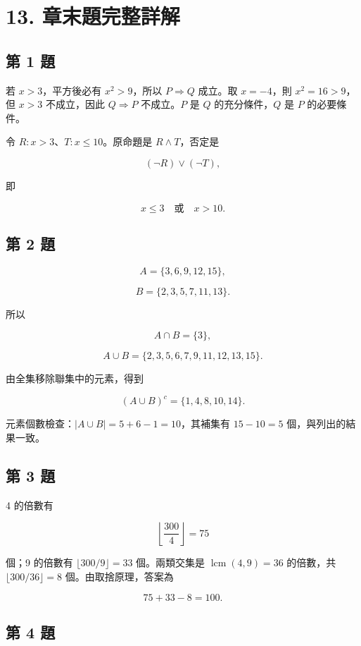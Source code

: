 \documentclass[11pt,a4paper]{article}
\begin{document}
\section{13. 章末題完整詳解}\label{ux7ae0ux672bux984cux5b8cux6574ux8a73ux89e3}

\subsection{第 1 題}\label{ux7b2c-1-ux984c}

若 \(x>3\)，平方後必有 \(x^2>9\)，所以 \(P\Rightarrow Q\) 成立。取 \(x=-4\)，則 \(x^2=16>9\)，但 \(x>3\) 不成立，因此 \(Q\Rightarrow P\) 不成立。\(P\) 是 \(Q\) 的充分條件，\(Q\) 是 \(P\) 的必要條件。

令 \(R:x>3\)、\(T:x\le10\)。原命題是 \(R\wedge T\)，否定是

\[
(\neg R)\vee(\neg T),
\]

即

\[
x\le3\quad\text{或}\quad x>10.
\]

\subsection{第 2 題}\label{ux7b2c-2-ux984c}

\[
A=\{3,6,9,12,15\},
\]

\[
B=\{2,3,5,7,11,13\}.
\]

所以

\[
A\cap B=\{3\},
\]

\[
A\cup B=\{2,3,5,6,7,9,11,12,13,15\}.
\]

由全集移除聯集中的元素，得到

\[
(A\cup B)^c=\{1,4,8,10,14\}.
\]

元素個數檢查：\(|A\cup B|=5+6-1=10\)，其補集有 \(15-10=5\) 個，與列出的結果一致。

\subsection{第 3 題}\label{ux7b2c-3-ux984c}

4 的倍數有

\[
\left\lfloor\frac{300}{4}\right\rfloor=75
\]

個；9 的倍數有 \(\lfloor300/9\rfloor=33\) 個。兩類交集是 \(\operatorname{lcm}(4,9)=36\) 的倍數，共 \(\lfloor300/36\rfloor=8\) 個。由取捨原理，答案為

\[
75+33-8=100.
\]

\subsection{第 4 題}\label{ux7b2c-4-ux984c}
\end{document}
